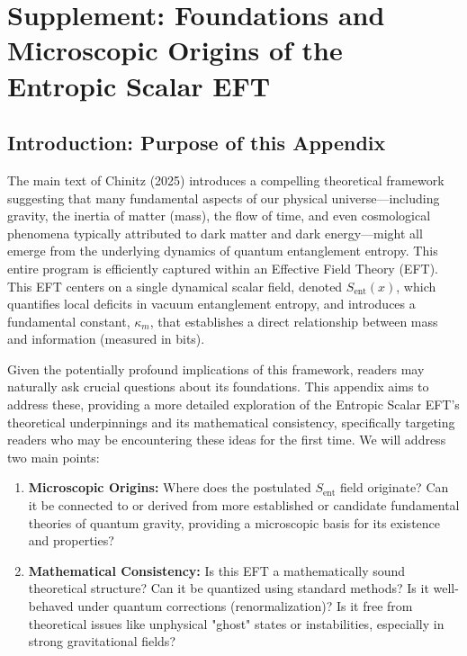 \documentclass[11pt]{article}
\begin{document}
\appendix
\section*{Supplement: Foundations and Microscopic Origins of the Entropic Scalar EFT}

\subsection*{Introduction: Purpose of this Appendix}

The main text of Chinitz (2025) \cite{Chinitz2025} introduces a compelling theoretical framework suggesting that many fundamental aspects of our physical universe—including gravity, the inertia of matter (mass), the flow of time, and even cosmological phenomena typically attributed to dark matter and dark energy—might all emerge from the underlying dynamics of quantum entanglement entropy. This entire program is efficiently captured within an Effective Field Theory (EFT). This EFT centers on a single dynamical scalar field, denoted $S_{\mathrm{ent}}(x)$, which quantifies local deficits in vacuum entanglement entropy, and introduces a fundamental constant, $\kappa_m$, that establishes a direct relationship between mass and information (measured in bits).

Given the potentially profound implications of this framework, readers may naturally ask crucial questions about its foundations. This appendix aims to address these, providing a more detailed exploration of the Entropic Scalar EFT's theoretical underpinnings and its mathematical consistency, specifically targeting readers who may be encountering these ideas for the first time. We will address two main points:

\begin{enumerate}
    \item[\textbf{Q1}] \textbf{Microscopic Origins:} Where does the postulated $S_{\mathrm{ent}}$ field originate? Can it be connected to or derived from more established or candidate fundamental theories of quantum gravity, providing a microscopic basis for its existence and properties?
    \item[\textbf{Q2}] \textbf{Mathematical Consistency:} Is this EFT a mathematically sound theoretical structure? Can it be quantized using standard methods? Is it well-behaved under quantum corrections (renormalization)? Is it free from theoretical issues like unphysical "ghost" states or instabilities, especially in strong gravitational fields?
\end{enumerate}
\end{document}
